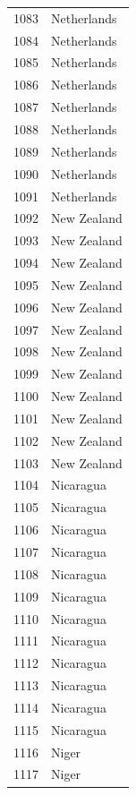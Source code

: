 \documentclass[
  letterpaper,
  DIV=11,
  numbers=noendperiod]{scrreprt}
\begin{document}
\begin{tabular}{ll}
1083 &               Netherlands \\
1084 &               Netherlands \\
1085 &               Netherlands \\
1086 &               Netherlands \\
1087 &               Netherlands \\
1088 &               Netherlands \\
1089 &               Netherlands \\
1090 &               Netherlands \\
1091 &               Netherlands \\
1092 &               New Zealand \\
1093 &               New Zealand \\
1094 &               New Zealand \\
1095 &               New Zealand \\
1096 &               New Zealand \\
1097 &               New Zealand \\
1098 &               New Zealand \\
1099 &               New Zealand \\
1100 &               New Zealand \\
1101 &               New Zealand \\
1102 &               New Zealand \\
1103 &               New Zealand \\
1104 &                 Nicaragua \\
1105 &                 Nicaragua \\
1106 &                 Nicaragua \\
1107 &                 Nicaragua \\
1108 &                 Nicaragua \\
1109 &                 Nicaragua \\
1110 &                 Nicaragua \\
1111 &                 Nicaragua \\
1112 &                 Nicaragua \\
1113 &                 Nicaragua \\
1114 &                 Nicaragua \\
1115 &                 Nicaragua \\
1116 &                     Niger \\
1117 &                     Niger \\

\end{tabular}
\end{document}
